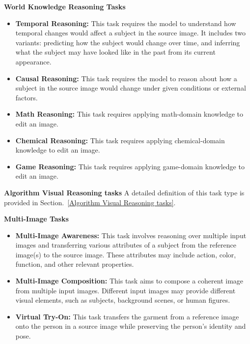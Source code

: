 \documentclass{llmxive}
\begin{document}
\textbf{World Knowledge Reasoning Tasks}
\begin{itemize}[leftmargin=2.2em, labelsep=0.4em, itemsep=2pt]
    \item \textbf{Temporal Reasoning:} This task requires the model to understand how temporal changes would affect a subject in the source image. It includes two variants: predicting how the subject would change over time, and inferring what the subject may have looked like in the past from its current appearance. 
    \item \textbf{Causal Reasoning: } This task requires the model to reason about how a subject in the source image would change under given conditions or external factors.
    \item \textbf{Math Reasoning: } This task requires applying math-domain knowledge to edit an image.
    \item \textbf{Chemical Reasoning: }  This task requires applying chemical-domain knowledge to edit an image.
    \item \textbf{Game Reasoning: } This task requires applying game-domain knowledge to edit an image.
\end{itemize}


\textbf{Algorithm Visual Reasoning tasks}
A detailed definition of this task type is provided in Section.~\ref{Algorithm Visual Reasoning tasks}.

\textbf{Multi-Image Tasks}
\begin{itemize}[leftmargin=2.2em, labelsep=0.4em, itemsep=2pt]
    \item \textbf{Multi-Image Awareness:}  This task involves reasoning over multiple input images and transferring various attributes of a subject from the reference image(s) to the source image. These attributes may include action, color, function, and other relevant properties. 
    \item \textbf{Multi-Image Composition: } This task aims to compose a coherent image from multiple input images. Different input images may provide different visual elements, such as subjects, background scenes, or human figures.
    \item \textbf{Virtual Try-On:} This task transfers the garment from a reference image onto the person in a source image while preserving the person's identity and pose.
\end{itemize}
\end{document}
